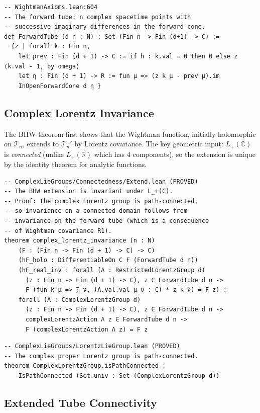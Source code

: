 \documentclass[11pt,a4paper]{article}
\begin{document}
\begin{lstlisting}
-- WightmanAxioms.lean:604
-- The forward tube: n complex spacetime points with
-- successive imaginary differences in the forward cone.
def ForwardTube (d n : N) : Set (Fin n -> Fin (d+1) -> C) :=
  {z | forall k : Fin n,
    let prev : Fin (d + 1) -> C := if h : k.val = 0 then 0 else z ⟨k.val - 1, by omega⟩
    let η : Fin (d + 1) -> R := fun μ => (z k μ - prev μ).im
    InOpenForwardCone d η }
\end{lstlisting}

\subsection{Complex Lorentz Invariance}

The BHW theorem first shows that the Wightman function, initially
holomorphic on $\mathscr{T}_n$, extends to $\mathscr{T}_n'$ by
Lorentz covariance. The key geometric input: $L_+(\mathbb{C})$ is
\emph{connected} (unlike $L_+(\mathbb{R})$ which has 4 components),
so the extension is unique by the identity theorem for analytic functions.

\begin{lstlisting}
-- ComplexLieGroups/Connectedness/Extend.lean (PROVED)
-- The BHW extension is invariant under L_+(C).
-- Proof: the complex Lorentz group is path-connected,
-- so invariance on a connected domain follows from
-- invariance on the forward tube (which is a consequence
-- of Wightman covariance R1).
theorem complex_lorentz_invariance (n : N)
    (F : (Fin n -> Fin (d + 1) -> C) -> C)
    (hF_holo : DifferentiableOn C F (ForwardTube d n))
    (hF_real_inv : forall (Λ : RestrictedLorentzGroup d)
      (z : Fin n -> Fin (d + 1) -> C), z ∈ ForwardTube d n ->
      F (fun k μ => ∑ ν, (Λ.val.val μ ν : C) * z k ν) = F z) :
    forall (Λ : ComplexLorentzGroup d)
      (z : Fin n -> Fin (d + 1) -> C), z ∈ ForwardTube d n ->
      complexLorentzAction Λ z ∈ ForwardTube d n ->
      F (complexLorentzAction Λ z) = F z
\end{lstlisting}

\begin{lstlisting}
-- ComplexLieGroups/LorentzLieGroup.lean (PROVED)
-- The complex proper Lorentz group is path-connected.
theorem ComplexLorentzGroup.isPathConnected :
    IsPathConnected (Set.univ : Set (ComplexLorentzGroup d))
\end{lstlisting}

\subsection{Extended Tube Connectivity}
\end{document}
